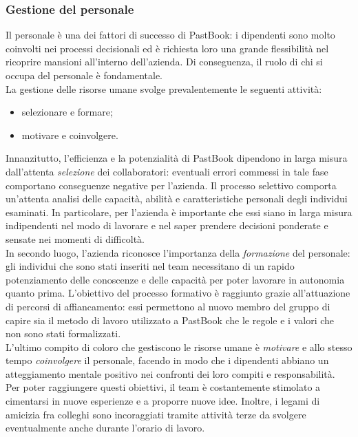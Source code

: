 			\subsubsection{Gestione del personale}
				Il personale è una dei fattori di successo di PastBook: i dipendenti sono molto coinvolti nei processi decisionali
				ed è richiesta loro una grande flessibilità nel ricoprire mansioni all'interno dell'azienda. Di conseguenza, il ruolo
				di chi si occupa del personale è fondamentale.\\
				La gestione delle risorse umane svolge prevalentemente le seguenti attività:
				\begin{itemize}
					\item selezionare e formare;
					\item motivare e coinvolgere.
				\end{itemize}
				Innanzitutto, l'efficienza e la potenzialità di PastBook dipendono in larga misura dall'attenta \emph{selezione} dei
				collaboratori: eventuali errori commessi in tale fase comportano conseguenze negative per l'azienda. Il processo
				selettivo comporta un'attenta analisi delle capacità, abilità e caratteristiche personali degli individui esaminati.
				In particolare, per l'azienda è importante che essi siano in larga misura indipendenti nel modo di lavorare e nel
				saper prendere decisioni ponderate e sensate nei momenti di difficoltà.\\
				In secondo luogo, l'azienda riconosce l'importanza della \emph{formazione} del personale: gli individui che sono
				stati inseriti nel team necessitano di un rapido potenziamento delle conoscenze e delle capacità per poter lavorare
				in autonomia quanto prima. L'obiettivo del processo formativo è raggiunto grazie all'attuazione di percorsi di
				affiancamento: essi permettono al nuovo membro del gruppo di capire sia il metodo di lavoro utilizzato a PastBook che
				le regole e i valori che non sono stati formalizzati.\\
				L'ultimo compito di coloro che gestiscono le risorse umane è \emph{motivare} e allo stesso tempo
				\emph{coinvolgere} il personale, facendo in modo che i dipendenti abbiano un atteggiamento mentale positivo nei
				confronti dei loro compiti e responsabilità. Per poter raggiungere questi obiettivi, il team è costantemente
				stimolato a cimentarsi in nuove esperienze e a proporre nuove idee. Inoltre, i legami di amicizia fra colleghi sono
				incoraggiati tramite attività terze da svolgere eventualmente anche durante l'orario di lavoro.
